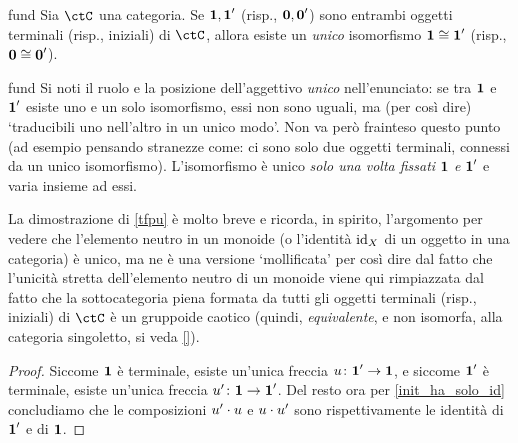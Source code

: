 \begin{hProposition}[TFPU]{fund}\label{tfpu}
 Sia \(\ctC\) una categoria. Se \(\textbf{1},\textbf{1}'\) (risp., \(\textbf{0},\textbf{0}'\)) sono entrambi oggetti terminali (risp., iniziali) di \(\ctC\), allora esiste un \emph{unico} isomorfismo \(\textbf{1}\cong\textbf{1}'\) (risp., \(\textbf{0}\cong \textbf{0}'\)).
\end{hProposition}
\begin{hRemark}{fund}
 Si noti il ruolo e la posizione dell'aggettivo \emph{unico} nell'enunciato: se tra \(\textbf{1}\) e \(\textbf{1}'\) esiste uno e un solo isomorfismo, essi non sono uguali, ma (per così dire) `traducibili uno nell'altro in un unico modo'. Non va però frainteso questo punto (ad esempio pensando stranezze come: ci sono solo due oggetti terminali, connessi da un unico isomorfismo). L'isomorfismo è unico \emph{solo una volta fissati} \(\textbf{1}\) \emph{e} \(\textbf{1}'\) e varia insieme ad essi.
\end{hRemark}
La dimostrazione di \ref{tfpu} è molto breve e ricorda, in spirito, l'argomento per vedere che l'elemento neutro in un monoide (o l'identità \(\mathrm{id}_X\) di un oggetto in una categoria) è unico, ma ne è una versione `mollificata' per così dire dal fatto che l'unicità stretta dell'elemento neutro di un monoide viene qui rimpiazzata dal fatto che la sottocategoria piena formata da tutti gli oggetti terminali (risp., iniziali) di \(\ctC\) è un gruppoide caotico (quindi, \emph{equivalente}, e non isomorfa, alla categoria singoletto, si veda \ref{}).
\begin{proof}
 Siccome \(\textbf{1}\) è terminale, esiste un'unica freccia \(u \colon \textbf{1}'\to \textbf{1}\), e siccome \(\textbf{1}'\) è terminale, esiste un'unica freccia \(u' \colon \textbf{1}\to\textbf{1}'\). Del resto ora per \ref{init_ha_solo_id} concludiamo che le composizioni \(u'\cdot u\) e \(u\cdot u'\) sono rispettivamente le identità di \(\textbf{1}'\) e di \(\textbf{1}\).
\end{proof}
